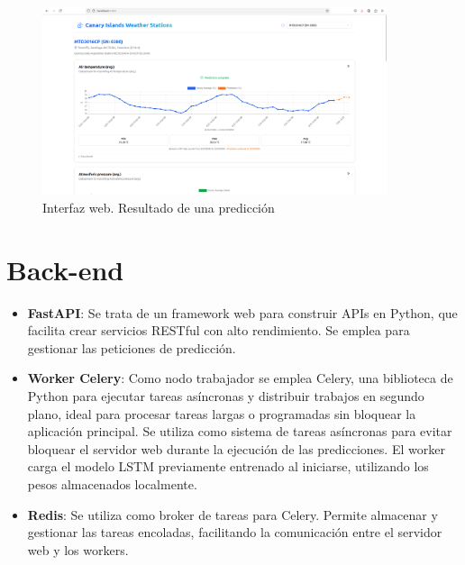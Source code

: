 \begin{figure}[H]
    \centering
    \includegraphics[width=0.9\textwidth]{images/frontend_prediction.png}
    \caption{Interfaz web. Resultado de una predicción}
    \label{frontend_prediction}
\end{figure}


\section{Back-end}

\begin{itemize}
    \item \textbf{FastAPI}: Se trata de un framework web para construir APIs en Python, que facilita crear servicios RESTful con alto rendimiento. Se emplea para gestionar las peticiones de predicción.
    \item \textbf{Worker Celery}: Como nodo trabajador se emplea Celery, una biblioteca de Python para ejecutar tareas asíncronas y distribuir trabajos en segundo plano, ideal para procesar tareas largas o programadas sin bloquear la aplicación principal. 
    Se utiliza como sistema de tareas asíncronas para evitar bloquear el servidor web durante la ejecución de las predicciones. El worker carga el modelo LSTM previamente entrenado al iniciarse, utilizando los pesos almacenados localmente. 
    \item \textbf{Redis}: Se utiliza como broker de tareas para Celery. Permite almacenar y gestionar las tareas encoladas, facilitando la comunicación entre el servidor web y los workers.
\end{itemize}


